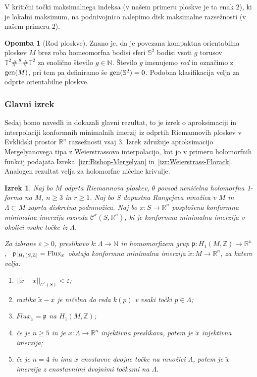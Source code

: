 \documentclass[12pt,a4paper,twoside]{article}
\theoremstyle{definition} %
\newtheorem{opomba}[definicija]{Opomba}
\theoremstyle{plain} %
\newtheorem{izrek}[definicija]{Izrek}
\numberwithin{equation}{section}  %
\newcommand{\R}{\mathbb R}
\newcommand{\N}{\mathbb N}
\newcommand{\Z}{\mathbb Z}
\begin{document}
V kritični točki maksimalnega indeksa (v našem primeru ploskve je ta enak $2$), ki je lokalni maksimum, na podnivojnico nalepimo disk maksimalne razsežnosti (v našem primeru $2$).

\begin{opomba} [Rod ploskve]
Znano je, da je povezana kompaktna orientabilna ploskev $M$ brez roba homeomorfna bodisi sferi $\mathbb{S}^{2}$ bodisi vsoti $g$ torusov 
$\mathbb{T}^{2} \# \stackrel{g}{\cdots} \# \mathbb{T}^{2}$ za enolično število $g \in \mathbb{N}$.
Število $g$ imenujemo \emph{rod} in označimo z $\textup{gen}(M)$, pri tem pa definiramo še $\textup{gen}(\mathbb{S}^{2}) = 0$.
Podobna klasifikacija velja za odprte orientabilne ploskve.
\end{opomba}

\subsubsection{Glavni izrek}
%
Sedaj bomo navedli in dokazali glavni rezultat, to je izrek o aproksimaciji in interpolaciji konformnih minimalnih imerzij iz odprtih Riemannovih ploskev v Evklidski prostor $\mathbb{R}^{n}$ razsežnosti vsaj $3$. Izrek združuje aproksimacijo Mergelyanovega tipa z Weierstrassovo interpolacijo, kot jo v primeru holomorfnih funkcij podajata Izreka~\ref{izr:Bishop-Mergelyan} in~\ref{izr:Weierstrass-Florack}.
Analogen rezultat velja za holomorfne ničelne krivulje.

\begin{izrek} \label{izr:glavni-izrek-CMI}
Naj bo $M$ odprta Riemannova ploskev, $\theta$ povsod neničelna holomorfna 1-forma na $M$, $n \geq 3$ in $r \geq 1$.
Naj bo $S$ dopustna Rungejeva množica v $M$ in $\Lambda \subset M$ zaprta diskretna podmnožica. 
Naj bo $x \colon S \to \R^{n}$ posplošena konformna minimalna imerzija razreda $\mathcal{C}^{r}(S, \R^{n})$, ki je konformna minimalna imerzija v okolici vsake točke iz $\Lambda$.

Za izbrane $\varepsilon > 0$, preslikavo $k \colon \Lambda \to \N$ in homomorfizem grup $\mathfrak{p} \colon H_{1}(M,\Z) \to \R^{n}$, \ $\mathfrak{p}|_{H_{1}(S,\Z)} = \textup{Flux}_{x}$ obstaja konformna minimalna imerzija $\tilde{x} \colon M \to \R^{n}$, za katero velja:
\begin{enumerate}
\item $||\tilde{x} - x||_{\mathcal{C}^{r}(S)} < \varepsilon$;
\item razlika $\tilde{x}-x$ je ničelna do reda $k(p)$ v vsaki točki $p\in \Lambda$;
\item $Flux_{\tilde{x}} = \mathfrak{p}$ na $H_{1}(M,\Z)$;
\item če je $n\geq5$ in je $x \colon \Lambda \to \R^{n}$ injektivna preslikava, potem je $\tilde{x}$ injektivna imerzija;
\item če je $n=4$ in ima $x$ enostavne dvojne točke na množici $\Lambda$, potem je $\tilde{x}$ imerzija z enostavnimi dvojnimi točkami na $\Lambda$.
\end{enumerate}
\end{izrek}
\end{document}
